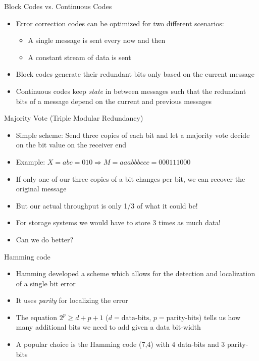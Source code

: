 \documentclass[aspectratio=169,hyperref={pdfpagelabels=false}]{beamer}
\begin{document}
\begin{frame}{Block Codes vs. Continuous Codes}
    \begin{itemize}
        \item Error correction codes can be optimized for two different scenarios:
        \begin{itemize}
            \item A single message is sent every now and then
            \item A constant stream of data is sent
        \end{itemize}
        \item Block codes generate their redundant bits only based on the current message
        \item Continuous codes keep \textit{state} in between messages such that the redundant bits of a message depend on the current and previous messages
    \end{itemize}
\end{frame}

\begin{frame}{Majority Vote (Triple Modular Redundancy)}
    \begin{itemize}
        \item Simple scheme: Send three copies of each bit and let a majority vote decide on the bit value on the receiver end
        \item Example: $X=abc=010 \Longrightarrow M=aaabbbccc=000111000$
        \item If only one of our three copies of a bit changes per bit, we can recover the original message
        \item But our actual throughput is only 1/3 of what it could be!
        \item For storage systems we would have to store 3 times as much data!
        \item Can we do better?
    \end{itemize}
\end{frame}

\begin{frame}{Hamming code}
    
    \begin{itemize}
        \item Hamming developed a scheme which allows for the detection and localization of a single bit error 
        \item It uses \textit{parity} for localizing the error
        \item The equation $2^p \geq d+p+1$ ($d=\text{data-bits}$, $p=\text{parity-bits}$) tells us how many additional bits we need to add given a data bit-width
        \item A popular choice is the Hamming code (7,4) with 4 data-bits and 3 parity-bits
        
    \end{itemize}
        
    \end{frame}
    
\end{document}
